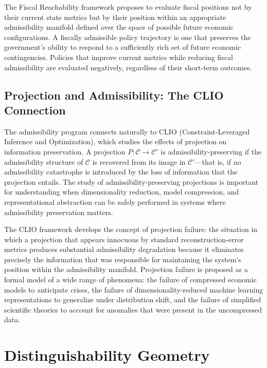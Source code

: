 \documentclass[11pt, oneside]{book}
\theoremstyle{definition}
\theoremstyle{remark}
\begin{document}
The Fiscal Reachability framework proposes to evaluate fiscal positions not by their current state metrics but by their position within an appropriate admissibility manifold defined over the space of possible future economic configurations. A fiscally admissible policy trajectory is one that preserves the government's ability to respond to a sufficiently rich set of future economic contingencies. Policies that improve current metrics while reducing fiscal admissibility are evaluated negatively, regardless of their short-term outcomes.

\section{Projection and Admissibility: The CLIO Connection}

The admissibility program connects naturally to CLIO (Constraint-Leveraged Inference and Optimization), which studies the effects of projection on information preservation. A projection $P : \mathcal{C} \to \mathcal{C}'$ is admissibility-preserving if the admissibility structure of $\mathcal{C}$ is recovered from its image in $\mathcal{C}'$—that is, if no admissibility catastrophe is introduced by the loss of information that the projection entails. The study of admissibility-preserving projections is important for understanding when dimensionality reduction, model compression, and representational abstraction can be safely performed in systems where admissibility preservation matters.

The CLIO framework develops the concept of projection failure: the situation in which a projection that appears innocuous by standard reconstruction-error metrics produces substantial admissibility degradation because it eliminates precisely the information that was responsible for maintaining the system's position within the admissibility manifold. Projection failure is proposed as a formal model of a wide range of phenomena: the failure of compressed economic models to anticipate crises, the failure of dimensionality-reduced machine learning representations to generalize under distribution shift, and the failure of simplified scientific theories to account for anomalies that were present in the uncompressed data.

\chapter{Distinguishability Geometry}
\end{document}
